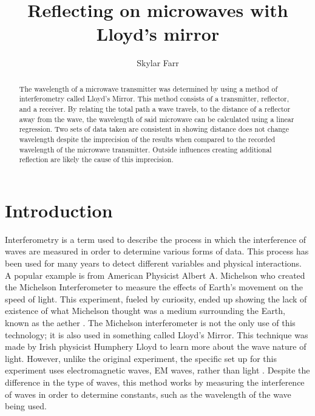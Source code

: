 \documentclass[rc]{physicsinprogress}
\begin{document}
\title{Reflecting on microwaves with Lloyd's mirror}
\author{Skylar Farr}
%
\begin{abstract}
    The wavelength of a microwave transmitter was determined by using a method of interferometry called Lloyd's Mirror. This method consists of a transmitter, reflector, and a receiver. By relating the total path a wave travels, to the distance of a reflector away from the wave, the wavelength of said microwave can be calculated using a linear regression. Two sets of data taken are consistent in showing distance does not change wavelength despite the imprecision of the results when compared to the recorded wavelength of the microwave transmitter. Outside influences creating additional reflection are likely the cause of this imprecision.
\end{abstract}


\maketitle
\section{Introduction}
    Interferometry is a term used to describe the process in which the interference of waves are measured in order to determine various forms of data. This process has been used for many years to detect different variables and physical interactions. A popular example is from American Physicist Albert A. Michelson who created the Michelson Interferometer to measure the effects of Earth's movement on the speed of light. This experiment, fueled by curiosity, ended up showing the lack of existence of what Michelson thought was a medium surrounding the Earth, known as the aether \cite{ranzan2018history}. The Michelson interferometer is not the only use of this technology; it is also used in something called Lloyd's Mirror. This technique was made by Irish physicist Humphery Lloyd to learn more about the wave nature of light. However, unlike the original experiment, the specific set up for this experiment uses electromagnetic waves, EM waves, rather than light \cite{bromwich1919x}. Despite the difference in the type of waves, this method works by measuring the interference of waves in order to determine constants, such as the wavelength of the wave being used.
\end{document}
